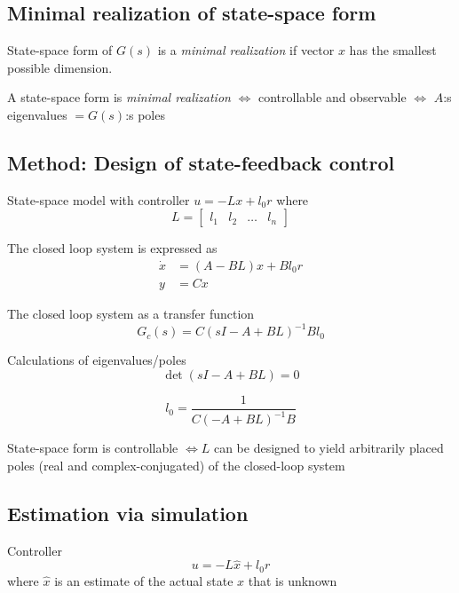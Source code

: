 \subsection{Minimal realization of state-space form}
State-space form of $G(s)$ is a \textit{minimal realization} if vector $x$ has the 
smallest possible dimension.

A state-space form is \textit{minimal realization} $\Leftrightarrow$ controllable and 
observable $\Leftrightarrow$ $A$:s eigenvalues $= G(s)$:s poles 

\subsection{Method: Design of state-feedback control}
State-space model with controller $u=-Lx+l_0r$ where
\begin{equation*}
    L = \begin{bmatrix} l_1 & l_2 & \ldots & l_n \end{bmatrix}
\end{equation*}

The closed loop system is expressed as
\begin{align*}
    \dot{x} &= (A-BL)x + Bl_0r \\ 
    y &= Cx 
\end{align*}

The closed loop system as a transfer function
\begin{equation*}
    G_c(s) = C(sI-A+BL)^{-1} Bl_0 
\end{equation*}

Calculations of eigenvalues/poles
\begin{equation*}
   \det(sI-A+BL) = 0
\end{equation*}

\begin{equation*}
    l_0 = \frac{1}{C(-A+BL)^{-1}B}
\end{equation*}

State-space form is controllable $\Leftrightarrow L$ can be designed to yield
arbitrarily placed poles (real and complex-conjugated) of the
closed-loop system

\subsection{Estimation via simulation}
Controller
\begin{equation*}
    u = -L\hat{x} + l_0r
\end{equation*}
where $\hat{x}$ is an estimate of the actual state $x$ that is unknown

